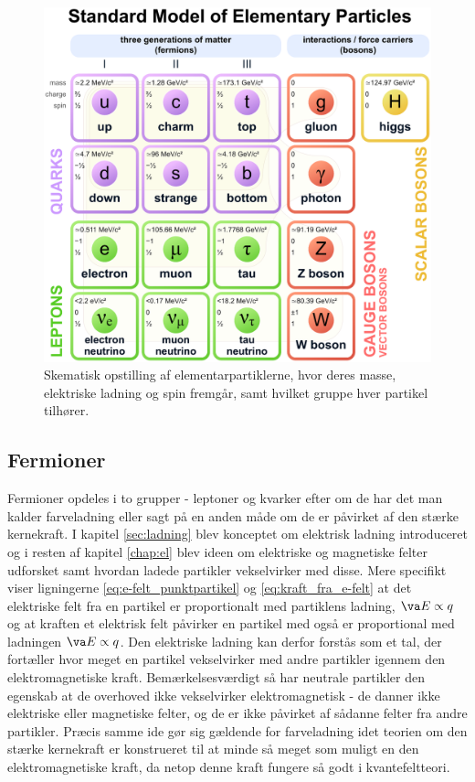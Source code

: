 \begin{figure}
    \centering
    \includegraphics[width=.75\textwidth]{Partikel/figurer/standardmodellen.eps}
    \caption{Skematisk opstilling af elementarpartiklerne, hvor deres masse, elektriske ladning og spin fremgår, samt hvilket gruppe hver partikel tilhører.}
    \label{fig:standardmodellen}
\end{figure}

\subsection{Fermioner}
Fermioner opdeles i to grupper - leptoner og kvarker efter om de har det man kalder farveladning eller sagt på en anden måde om de er påvirket af den stærke kernekraft. I kapitel \ref{sec:ladning} blev konceptet om elektrisk ladning introduceret og i resten af kapitel \ref{chap:el} blev ideen om elektriske og magnetiske felter udforsket samt hvordan ladede partikler vekselvirker med disse. Mere specifikt viser ligningerne \ref{eq:e-felt_punktpartikel} og \ref{eq:kraft_fra_e-felt} at det elektriske felt fra en partikel er proportionalt med partiklens ladning, $\va E \propto q$ og at kraften et elektrisk felt påvirker en partikel med også er proportional med ladningen $\va E \propto q$. Den elektriske ladning kan derfor forstås som et tal, der fortæller hvor meget en partikel vekselvirker med andre partikler igennem den elektromagnetiske kraft. Bemærkelsesværdigt så har neutrale partikler den egenskab at de overhoved ikke vekselvirker elektromagnetisk - de danner ikke elektriske eller magnetiske felter, og de er ikke påvirket af sådanne felter fra andre partikler. Præcis samme ide gør sig gældende for farveladning idet teorien om den stærke kernekraft er konstrueret til at minde så meget som muligt en den elektromagnetiske kraft, da netop denne kraft fungere så godt i kvantefeltteori.

